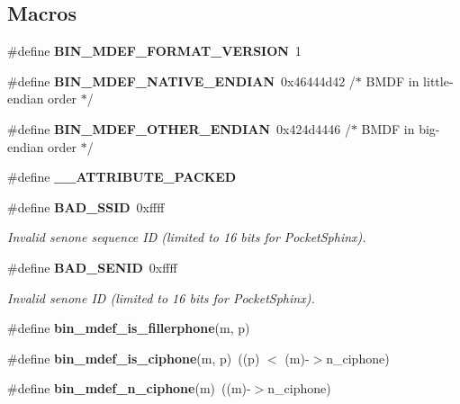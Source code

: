 \subsection*{Macros}
\begin{DoxyCompactItemize}
\item 
\mbox{\label{bin__mdef_8h_a200a7e1836fa80ffe56b15334b1a8d1d}} 
\#define {\bfseries B\+I\+N\+\_\+\+M\+D\+E\+F\+\_\+\+F\+O\+R\+M\+A\+T\+\_\+\+V\+E\+R\+S\+I\+ON}~1
\item 
\mbox{\label{bin__mdef_8h_a9d58ffda11ea44f2681848072cb64ddd}} 
\#define {\bfseries B\+I\+N\+\_\+\+M\+D\+E\+F\+\_\+\+N\+A\+T\+I\+V\+E\+\_\+\+E\+N\+D\+I\+AN}~0x46444d42 /$\ast$ \textquotesingle{}\+B\+M\+D\+F\textquotesingle{} in little-\/endian order $\ast$/
\item 
\mbox{\label{bin__mdef_8h_aafe4efcf837bc5c4b2392cd7e77c1ebd}} 
\#define {\bfseries B\+I\+N\+\_\+\+M\+D\+E\+F\+\_\+\+O\+T\+H\+E\+R\+\_\+\+E\+N\+D\+I\+AN}~0x424d4446  /$\ast$ \textquotesingle{}\+B\+M\+D\+F\textquotesingle{} in big-\/endian order $\ast$/
\item 
\mbox{\label{bin__mdef_8h_aefbcc16d264f773388235497c2e3518f}} 
\#define {\bfseries \+\_\+\+\_\+\+A\+T\+T\+R\+I\+B\+U\+T\+E\+\_\+\+P\+A\+C\+K\+ED}
\item 
\mbox{\label{bin__mdef_8h_a8ee283c316e9f4aa8e6d18c1d44026bc}} 
\#define \textbf{ B\+A\+D\+\_\+\+S\+S\+ID}~0xffff
\begin{DoxyCompactList}\small\item\em Invalid senone sequence ID (limited to 16 bits for Pocket\+Sphinx). \end{DoxyCompactList}\item 
\mbox{\label{bin__mdef_8h_ab6c771eca798ab8c94e0933a1f8daafc}} 
\#define \textbf{ B\+A\+D\+\_\+\+S\+E\+N\+ID}~0xffff
\begin{DoxyCompactList}\small\item\em Invalid senone ID (limited to 16 bits for Pocket\+Sphinx). \end{DoxyCompactList}\item 
\#define {\bfseries bin\+\_\+mdef\+\_\+is\+\_\+fillerphone}(m,  p)
\item 
\mbox{\label{bin__mdef_8h_ad1440dcf8f6df7daf54dca1c85b7aa9e}} 
\#define {\bfseries bin\+\_\+mdef\+\_\+is\+\_\+ciphone}(m,  p)~((p) $<$ (m)-\/$>$n\+\_\+ciphone)
\item 
\mbox{\label{bin__mdef_8h_a3bf9a556739b5b6651eb2bfa72fcb427}} 
\#define {\bfseries bin\+\_\+mdef\+\_\+n\+\_\+ciphone}(m)~((m)-\/$>$n\+\_\+ciphone)
\item 

\end{DoxyCompactItemize}
